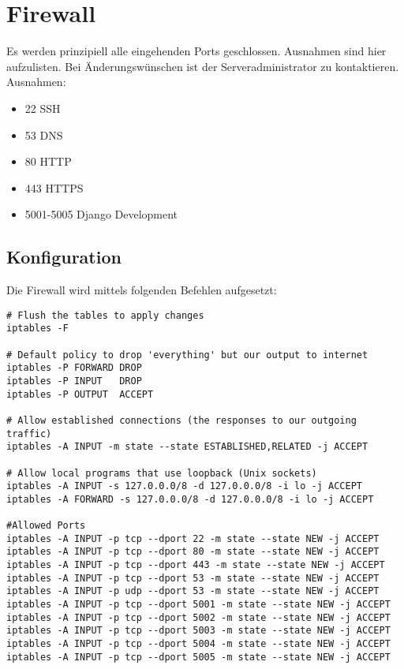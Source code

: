 \documentclass[12pt,a4paper,oneside,ngerman]{scrartcl}
\begin{document}
\section{Firewall}
Es werden prinzipiell alle eingehenden Ports geschlossen. Ausnahmen sind hier aufzulisten. Bei Änderungswünschen ist der Serveradministrator zu kontaktieren.\\

Ausnahmen:
\begin{itemize}
\item 22	SSH
\item 53	DNS
\item 80	HTTP
\item 443	HTTPS
\item 5001-5005 Django Development
\end{itemize}

\subsection{Konfiguration}
Die Firewall wird mittels folgenden Befehlen aufgesetzt:
\begin{lstlisting}
# Flush the tables to apply changes
iptables -F

# Default policy to drop 'everything' but our output to internet
iptables -P FORWARD DROP
iptables -P INPUT   DROP
iptables -P OUTPUT  ACCEPT

# Allow established connections (the responses to our outgoing traffic)
iptables -A INPUT -m state --state ESTABLISHED,RELATED -j ACCEPT

# Allow local programs that use loopback (Unix sockets)
iptables -A INPUT -s 127.0.0.0/8 -d 127.0.0.0/8 -i lo -j ACCEPT
iptables -A FORWARD -s 127.0.0.0/8 -d 127.0.0.0/8 -i lo -j ACCEPT

#Allowed Ports
iptables -A INPUT -p tcp --dport 22 -m state --state NEW -j ACCEPT
iptables -A INPUT -p tcp --dport 80 -m state --state NEW -j ACCEPT
iptables -A INPUT -p tcp --dport 443 -m state --state NEW -j ACCEPT
iptables -A INPUT -p tcp --dport 53 -m state --state NEW -j ACCEPT
iptables -A INPUT -p udp --dport 53 -m state --state NEW -j ACCEPT
iptables -A INPUT -p tcp --dport 5001 -m state --state NEW -j ACCEPT
iptables -A INPUT -p tcp --dport 5002 -m state --state NEW -j ACCEPT
iptables -A INPUT -p tcp --dport 5003 -m state --state NEW -j ACCEPT
iptables -A INPUT -p tcp --dport 5004 -m state --state NEW -j ACCEPT
iptables -A INPUT -p tcp --dport 5005 -m state --state NEW -j ACCEPT
\end{lstlisting}
\end{document}
